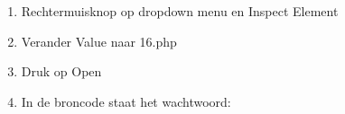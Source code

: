 \begin{enumerate}
  \item Rechtermuisknop op dropdown menu en Inspect Element
  \item Verander Value naar 16.php%
  \item Druk op Open
  \item In de broncode staat het wachtwoord: 
\end{enumerate}